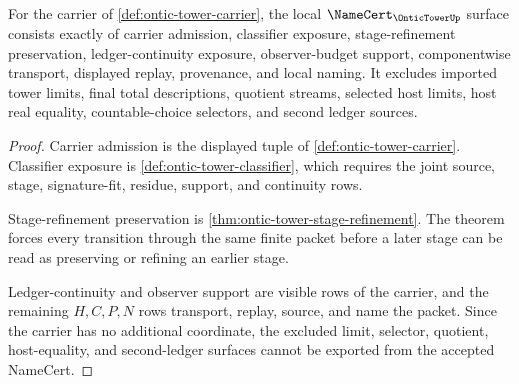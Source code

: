 \begin{theorem}
\label{thm:ontic-tower-namecert-obligation-surface}
For the carrier of \autoref{def:ontic-tower-carrier}, the local $\NameCert_{\OnticTowerUp}$ surface consists exactly of carrier admission, classifier exposure, stage-refinement preservation, ledger-continuity exposure, observer-budget support, componentwise transport, displayed replay, provenance, and local naming. It excludes imported tower limits, final total descriptions, quotient streams, selected host limits, host real equality, countable-choice selectors, and second ledger sources.
\end{theorem}
\begin{proof}
Carrier admission is the displayed tuple of \autoref{def:ontic-tower-carrier}. Classifier exposure is \autoref{def:ontic-tower-classifier}, which requires the joint source, stage, signature-fit, residue, support, and continuity rows.

Stage-refinement preservation is \autoref{thm:ontic-tower-stage-refinement}. The theorem forces every transition through the same finite packet before a later stage can be read as preserving or refining an earlier stage.

Ledger-continuity and observer support are visible rows of the carrier, and the remaining $H,C,P,N$ rows transport, replay, source, and name the packet. Since the carrier has no additional coordinate, the excluded limit, selector, quotient, host-equality, and second-ledger surfaces cannot be exported from the accepted NameCert.
\end{proof}

